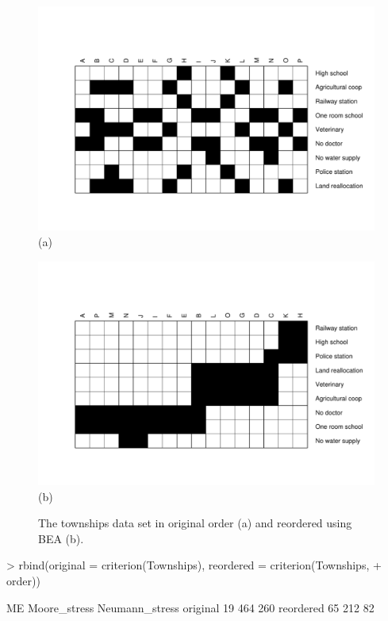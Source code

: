 \documentclass[fleqn, a4paper]{article}
\begin{document}
\begin{figure}
    \centering
    \includegraphics[width=12cm, trim=0 40 0 30]{seriation-binary1} \\
    (a)    

    \includegraphics[width=12cm, trim=0 40 0 30]{seriation-binary2} \\
    (b)   

    \caption{The townships data set in original order (a) and 
    reordered using BEA (b).}
    \label{fig:binary}
\end{figure}


\begin{Schunk}
\begin{Sinput}
> rbind(original = criterion(Townships), reordered = criterion(Townships, 
+     order))
\end{Sinput}
\begin{Soutput}
          ME Moore_stress Neumann_stress
original  19          464            260
reordered 65          212             82
\end{Soutput}
\end{Schunk}
\end{document}
